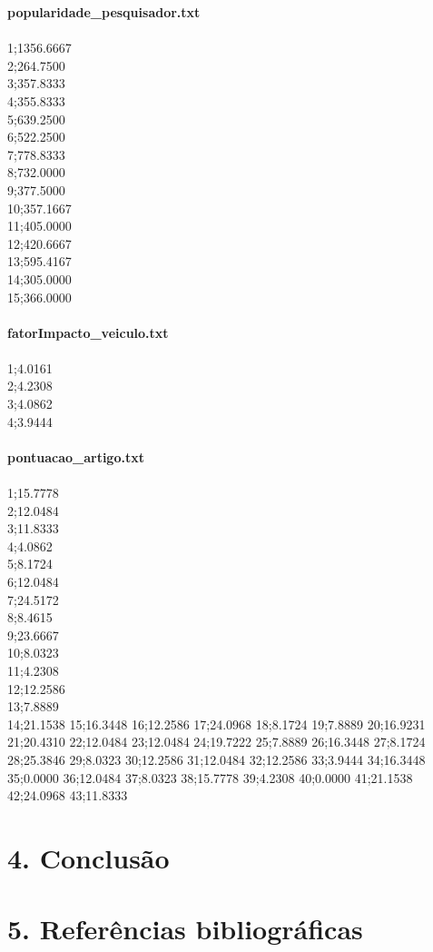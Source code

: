 \documentclass[12pt, a4paper]{article}
\begin{document}
  \textbf{popularidade\_pesquisador.txt}\\\\
  1;1356.6667\\
  2;264.7500\\
  3;357.8333\\
  4;355.8333\\
  5;639.2500\\
  6;522.2500\\
  7;778.8333\\
  8;732.0000\\
  9;377.5000\\
  10;357.1667\\
  11;405.0000\\
  12;420.6667\\
  13;595.4167\\
  14;305.0000\\
  15;366.0000\\\\

  \textbf{fatorImpacto\_veiculo.txt}\\\\
  1;4.0161\\
  2;4.2308\\
  3;4.0862\\
  4;3.9444\\\\

  \textbf{pontuacao\_artigo.txt}\\\\
  1;15.7778\\
  2;12.0484\\
  3;11.8333\\
  4;4.0862\\
  5;8.1724\\
  6;12.0484\\
  7;24.5172\\
  8;8.4615\\
  9;23.6667\\
  10;8.0323\\
  11;4.2308\\
  12;12.2586\\
  13;7.8889\\
  14;21.1538
  15;16.3448
  16;12.2586
  17;24.0968
  18;8.1724
  19;7.8889
  20;16.9231
  21;20.4310
  22;12.0484
  23;12.0484
  24;19.7222
  25;7.8889
  26;16.3448
  27;8.1724
  28;25.3846
  29;8.0323
  30;12.2586
  31;12.0484
  32;12.2586
  33;3.9444
  34;16.3448
  35;0.0000
  36;12.0484
  37;8.0323
  38;15.7778
  39;4.2308
  40;0.0000
  41;21.1538
  42;24.0968
  43;11.8333



\section*{4. Conclusão}


\section*{5. Referências bibliográficas}
\end{document}
